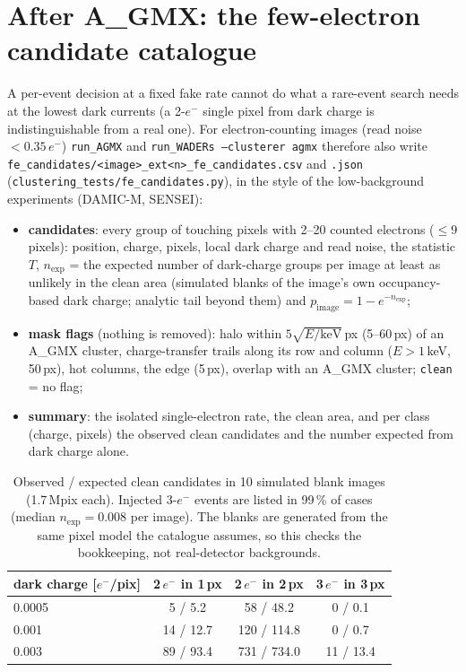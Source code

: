 \documentclass[11pt,a4paper]{article}
\newcommand{\el}{\ensuremath{e^-}}
\newcommand{\AGMX}{A\_GMX}
\newcommand{\code}[1]{\texttt{#1}}
\begin{document}
\section{After \AGMX: the few-electron candidate catalogue}\label{sec:fecand}

A per-event decision at a fixed fake rate cannot do what a rare-event search needs at the lowest dark currents (a 2-\el{}
single pixel from dark charge is indistinguishable from a real one). For electron-counting images (read noise $<0.35$\,\el)
\code{run\_AGMX} and \code{run\_WADERs --clusterer agmx} therefore also write
\code{fe\_candidates/<image>\_ext<n>\_fe\_candidates.csv} and \code{.json} (\code{clustering\_tests/fe\_candidates.py}), in the
style of the low-background experiments (DAMIC-M, SENSEI):
\begin{itemize}
\item \textbf{candidates}: every group of touching pixels with 2--20 counted electrons ($\le9$ pixels): position, charge,
pixels, local dark charge and read noise, the statistic $T$, $n_\mathrm{exp}$ = the expected number of dark-charge groups per
image at least as unlikely in the clean area (simulated blanks of the image's own occupancy-based dark charge; analytic tail
beyond them) and $p_\mathrm{image}=1-e^{-n_\mathrm{exp}}$;
\item \textbf{mask flags} (nothing is removed): halo within $5\sqrt{E/\mathrm{keV}}$\,px (5--60\,px) of an \AGMX{} cluster,
charge-transfer trails along its row and column ($E>1$\,keV, 50\,px), hot columns, the edge (5\,px), overlap with an \AGMX{}
cluster; \code{clean} = no flag;
\item \textbf{summary}: the isolated single-electron rate, the clean area, and per class (charge, pixels) the observed clean
candidates and the number expected from dark charge alone.
\end{itemize}

\begin{table}[H]\centering\small
\begin{tabular}{lccc}
\toprule
dark charge [\el/pix] & 2\,\el{} in 1\,px & 2\,\el{} in 2\,px & 3\,\el{} in 3\,px \\
\midrule
0.0005 & 5 / 5.2 & 58 / 48.2 & 0 / 0.1 \\
0.001 & 14 / 12.7 & 120 / 114.8 & 0 / 0.7 \\
0.003 & 89 / 93.4 & 731 / 734.0 & 11 / 13.4 \\
\bottomrule
\end{tabular}
\caption*{Observed / expected clean candidates in 10 simulated blank images (1.7\,Mpix each). Injected 3-\el{} events are
listed in 99\,\% of cases (median $n_\mathrm{exp}=0.008$ per image). The blanks are generated from the same pixel model the
catalogue assumes, so this checks the bookkeeping, not real-detector backgrounds.}
\end{table}
\end{document}
